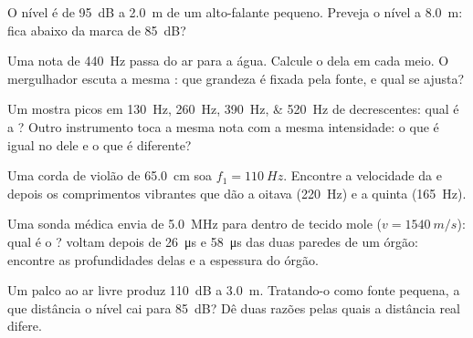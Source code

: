\begin{exercise}[$\star\star$]\label{exo:g12:sound-acoustics:8}
O nível é de \qty{95}{dB} a \qty{2.0}{m} de um alto-falante pequeno.
Preveja o nível a \qty{8.0}{m}: fica abaixo da marca de \qty{85}{dB}?
\end{exercise}

\begin{exercise}[$\star\star$]\label{exo:g12:sound-acoustics:9}
Uma nota de \qty{440}{Hz} passa do ar para a água. Calcule o  dela em cada meio. O mergulhador escuta a mesma : que
grandeza é fixada pela fonte, e qual se ajusta?
\end{exercise}

\begin{exercise}[$\star\star$]\label{exo:g12:sound-acoustics:10}
Um  mostra picos em \qtylist{130;260;390;520}{Hz} de 
decrescentes: qual é a ? Outro instrumento toca a mesma nota
com a mesma intensidade: o que é igual no  dele e o que é
diferente?
\end{exercise}

\begin{exercise}[$\star\star$]\label{exo:g12:sound-acoustics:11}
Uma corda de violão de \qty{65.0}{cm} soa $f_1 = \qty{110}{Hz}$.
Encontre a velocidade da  e depois os comprimentos vibrantes que dão
a oitava (\qty{220}{Hz}) e a quinta (\qty{165}{Hz}).
\end{exercise}

\begin{exercise}[$\star\star\star$]\label{exo:g12:sound-acoustics:12}
Uma sonda médica envia  de \qty{5.0}{MHz} para dentro de tecido
mole ($v = \qty{1540}{m/s}$): qual é o ?  voltam
depois de \qty{26}{\micro s} e \qty{58}{\micro s} das duas paredes de um
órgão: encontre as profundidades delas e a espessura do órgão.
\end{exercise}

\begin{exercise}[$\star\star\star$]\label{exo:g12:sound-acoustics:13}
Um palco ao ar livre produz \qty{110}{dB} a \qty{3.0}{m}. Tratando-o
como fonte pequena, a que distância o nível cai para \qty{85}{dB}? Dê
duas razões pelas quais a distância real difere.
\end{exercise}

